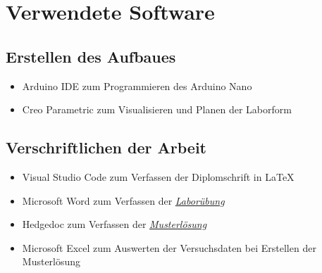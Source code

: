 \section{Verwendete Software}

\subsection{Erstellen des Aufbaues}

\begin{itemize}
    \item Arduino IDE zum Programmieren des Arduino Nano
    \item Creo Parametric zum Visualisieren und Planen der Laborform
\end{itemize}

\subsection{Verschriftlichen der Arbeit}

\begin{itemize}
    \item Visual Studio Code zum Verfassen der Diplomschrift in LaTeX
    \item Microsoft Word zum Verfassen der \hyperref[labuebung]{\textit{Laborübung}}
    \item Hedgedoc zum Verfassen der \hyperref[muster]{\textit{Musterlösung}}
    \item Microsoft Excel zum Auswerten der Versuchsdaten bei Erstellen der Musterlösung
\end{itemize}